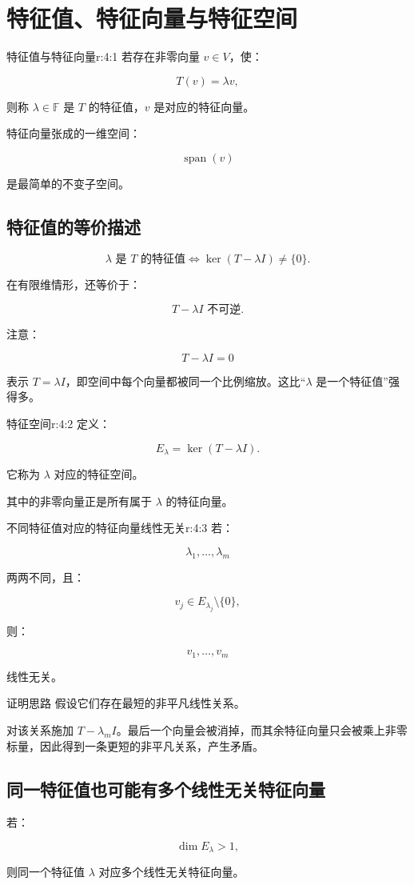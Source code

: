 
\chapter{特征值、特征向量与特征空间}


\begin{jdefn}{特征值与特征向量}{r:4:1}
若存在非零向量 $v\in V$，使：

\[
T(v)=\lambda v,
\]

则称 $\lambda\in\mathbb F$ 是 $T$ 的特征值，$v$ 是对应的特征向量。

特征向量张成的一维空间：

\[
\operatorname{span}(v)
\]

是最简单的不变子空间。
\end{jdefn}

\section{特征值的等价描述}

\[
\lambda\text{ 是 }T\text{ 的特征值}
\iff
\ker(T-\lambda I)\ne\{0\}.
\]

在有限维情形，还等价于：

\[
T-\lambda I\text{ 不可逆}.
\]

注意：

\[
T-\lambda I=0
\]

表示 $T=\lambda I$，即空间中每个向量都被同一个比例缩放。这比“$\lambda$ 是一个特征值”强得多。

\begin{jdefn}{特征空间}{r:4:2}
定义：

\[
E_\lambda
=
\ker(T-\lambda I).
\]

它称为 $\lambda$ 对应的特征空间。

其中的非零向量正是所有属于 $\lambda$ 的特征向量。
\end{jdefn}

\begin{jprop}{不同特征值对应的特征向量线性无关}{r:4:3}
若：

\[
\lambda_1,\ldots,\lambda_m
\]

两两不同，且：

\[
v_j\in E_{\lambda_j}\setminus\{0\},
\]

则：

\[
v_1,\ldots,v_m
\]

线性无关。
\end{jprop}

\begin{jproof}{证明思路}
假设它们存在最短的非平凡线性关系。

对该关系施加 $T-\lambda_m I$。最后一个向量会被消掉，而其余特征向量只会被乘上非零标量，因此得到一条更短的非平凡关系，产生矛盾。
\end{jproof}

\section{同一特征值也可能有多个线性无关特征向量}

若：

\[
\dim E_\lambda>1,
\]

则同一个特征值 $\lambda$ 对应多个线性无关特征向量。
